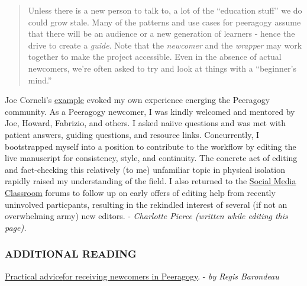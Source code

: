 \begin{quote}
Unless there is a new person to talk to, a lot of the ``education
stuff'' we do could grow stale. Many of the patterns and use cases for
peeragogy assume that there will be an audience or a new generation of
learners - hence the drive to create a \emph{guide}. Note that the
\emph{newcomer} and the \emph{wrapper} may work together to make the
project accessible. Even in the absence of actual newcomers, we're often
asked to try and look at things with a ``beginner's mind.''
\end{quote}
Joe Corneli's
\href{http://peeragogy.org/practice/heuristics/heartbeat/}{example}
evoked my own experience energing the Peeragogy community. As a
Peeragogy newcomer, I was kindly welcomed and mentored by Joe, Howard,
Fabrizio, and others. I asked naiive questions and was met with patient
answers, guiding questions, and resource links. Concurrently, I
bootstrapped myself into a position to contribute to the workflow by
editing the live manuscript for consistency, style, and continuity. The
concrete act of editing and fact-checking this relatively (to me)
unfamiliar topic in physical isolation rapidly raised my understanding
of the field. I also returned to the
\href{http://socialmediaclassroom.com/host/peeragogy}{Social Media
Classroom} forums to follow up on early offers of editing help from
recently uninvolved particpants, resulting in the rekindled interest of
several (if not an overwhelming army) new editors. - \emph{Charlotte
Pierce (written while editing this page).}

\subsubsection{ADDITIONAL READING}

\href{http://socialmediaclassroom.com/host/peeragogy/forum/suggest-new-discussion-topics\#comment-1796}{Practical
advice}\href{http://socialmediaclassroom.com/host/peeragogy/forum/suggest-new-discussion-topics\#comment-1796}{for
receiving newcomers in Peeragogy}. - \emph{by Regis Barondeau}
